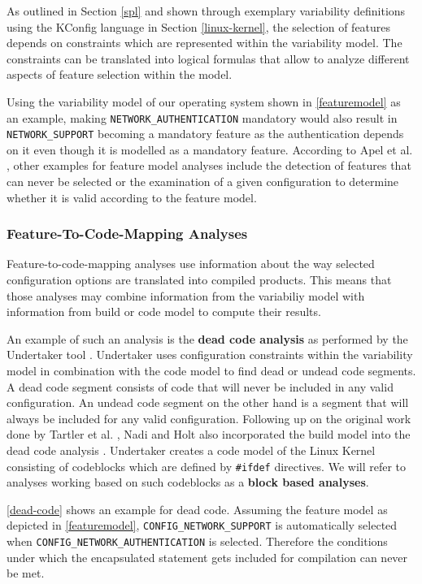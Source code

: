 \documentclass[a4paper]{article}
\begin{document}
As outlined in Section \ref{spl} and shown through exemplary variability definitions using the KConfig language in Section \ref{linux-kernel}, the selection of features depends on constraints which are represented within the variability model. The constraints can be translated into logical formulas that allow to analyze different aspects of feature selection within the model.

Using the variability model of our operating system shown in \autoref{featuremodel} as an example, making \texttt{NETWORK\_AUTHENTICATION} mandatory would also result in \texttt{NETWORK\_SUPPORT} becoming a mandatory feature as the authentication depends on it even though it is modelled as a mandatory feature.  According to Apel et al. \cite{Apel:2013:FSP:2541773}, other examples for feature model analyses include the detection of features that can never be selected or the examination of a given configuration to determine whether it is valid according to the feature model.

\subsubsection{Feature-To-Code-Mapping Analyses}\label{feature-code-mapping}

Feature-to-code-mapping analyses use information about the way selected configuration options are translated into compiled products. This means that those analyses may combine information from the variabiliy model with information from build or code model to compute their results.

An example of such an analysis is the \textbf{dead code analysis} as performed by the Undertaker tool \cite{Tartler:2011:FCC:1966445.1966451}. Undertaker uses configuration constraints within the variability model in combination with the code model to find dead or undead code segments. A dead code segment consists of code that will never be included in any valid configuration. An undead code segment on the other hand is a segment that will always be included for any valid configuration. Following up on the original work done by  Tartler et al. \cite{Tartler:2011:FCC:1966445.1966451}, Nadi and Holt also incorporated the build model into the dead code analysis \cite{mining-kbuild}. Undertaker creates a code model of the Linux Kernel consisting of codeblocks which are defined by \texttt{\#ifdef} directives. We will refer to analyses working based on such codeblocks as a \textbf{block based analyses}.

\autoref{dead-code} shows an example for dead code. Assuming the feature model as depicted in \autoref{featuremodel}, \texttt{CONFIG\_NETWORK\_SUPPORT} is automatically selected when \texttt{CONFIG\_NETWORK\_AUTHENTICATION} is selected. Therefore the conditions under which the encapsulated statement gets included for compilation can never be met.
\end{document}
